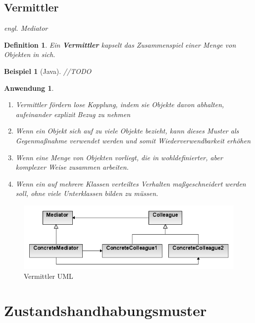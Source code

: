 \documentclass[a4paper]{article}
\theoremstyle{break}
\newtheorem{defi}{Definition}[section]
\newtheorem{ex}{Beispiel}[section]
\newtheorem{why}{Anwendung}[section]
\begin{document}
\newpage
\subsection{Vermittler}
\textit{engl. Mediator}
\begin{defi}
	Ein \textbf{Vermittler} kapselt das Zusammenspiel einer Menge von Objekten in sich.
\end{defi}
\begin{ex}[Java]
	//TODO
\end{ex}
\begin{why}
	\begin{enumerate}
		\item Vermittler fördern lose Kopplung, indem sie Objekte davon	abhalten, aufeinander explizit Bezug zu nehmen
		\item Wenn ein Objekt sich auf zu viele Objekte bezieht, kann dieses Muster als Gegenmaßnahme verwendet werden und somit Wiederverwendbarkeit erhöhen
		\item Wenn eine Menge von Objekten vorliegt, die in wohldefinierter, aber komplexer Weise zusammen arbeiten.
		\item Wenn ein auf mehrere Klassen verteiltes Verhalten maßgeschneidert werden soll, ohne viele Unterklassen bilden zu müssen.
	\end{enumerate}
\end{why}
\begin{figure}[H]
	\centering
	\includegraphics[width=\textwidth]{../diagrams/uml/MediatorPattern.png}
	\caption{Vermittler UML}
\end{figure}

\newpage
\section{Zustandshandhabungsmuster}
\end{document}
